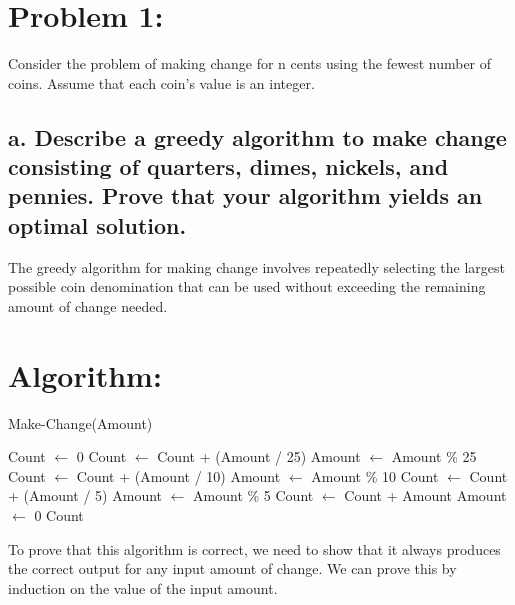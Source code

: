 \documentclass[fleqn,10pt]{olplainarticle}
\begin{document}
\flushbottom
\thispagestyle{empty}

\section*{Problem 1:}

Consider the problem of making change for n cents using the fewest number of coins. Assume that each coin’s value is an integer.

\subsection*{a.	Describe a greedy algorithm to make change consisting of quarters, dimes, nickels, and pennies. Prove that your algorithm yields an optimal solution.\newline }

The greedy algorithm for making change involves repeatedly selecting the largest possible coin denomination that can be used without exceeding the remaining amount of change needed.

\section*{Algorithm:}

\begin{algorithm}
        \caption{Make-Change(Amount)}
        \begin{algorithmic}[1]
            \State Count $\gets$ 0
                    \State Count $\gets$ Count + (Amount / 25)
                    \State Amount $\gets$ Amount \% 25
                    \State Count $\gets$ Count + (Amount / 10)
                    \State Amount $\gets$ Amount \% 10
                    \State Count $\gets$ Count + (Amount / 5)
                    \State Amount $\gets$ Amount \% 5
                \Else
                    \State Count $\gets$ Count + Amount
                    \State Amount $\gets$ 0
                \EndIf
            \EndWhile
            \State \Return Count
        \end{algorithmic}
    \end{algorithm}

To prove that this algorithm is correct, we need to show that it always produces the correct output for any input amount of change.
We can prove this by induction on the value of the input amount.
\end{document}
